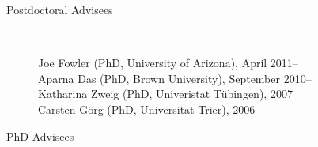\documentclass[10pt]{article}
\begin{document}
\begin{description}
\begin{comment}
\item [Press Coverage]\

\begin{enumerate}


\item ``UA Faculty Member Earns Humboldt Fellowship.''\\{\em
    University of Arizona News}, May 26, 2011.

\item ``American Professor Installs First University Wireless Network.''\\ {\em University of Botswana Horizon}, April 11, 2007.

\item ``Professor Sees Societal Connections in Graphics.''\\ {\em Arizona Daily Star}, August 14, 2006.


\item ``UA Computer Scientist Wins Fulbright Scholarship.''\\ {\em University of Arizona News}, May 8, 2006. 

\item ``Journal Publishers Turn to Software to Root Out Plagiarism by Scholars.''\\{\em The Chronicle of Higher Education}, June 10, 2005.

\item ``Taking on the Cheats.''\\{\em Nature 435, p.~258-259}, May 19, 2005.
\end{enumerate}
\end{comment}

\vspace{-.1cm}\item [Postdoctoral Advisees]\

Joe Fowler (PhD, University of Arizona), April 2011--\\
Aparna Das (PhD, Brown University), September 2010--\\
Katharina Zweig (PhD, Univeristat T\"ubingen), 2007\\
Carsten G\"org (PhD, Universitat Trier), 2006

\vspace{-.0cm}\item [PhD Advisees]\


\end{description}
\end{document}
